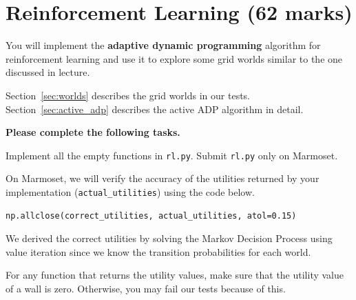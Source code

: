 \documentclass[12pt]{article}
\begin{document}
\newpage
\section{Reinforcement Learning (62 marks)}

You will implement the {\bf adaptive dynamic programming} algorithm for reinforcement learning and use it to explore some grid worlds similar to the one discussed in lecture.

Section~\ref{sec:worlds} describes the grid worlds in our tests. Section~\ref{sec:active_adp} describes the active ADP algorithm in detail.

{\bf Please complete the following tasks.}

Implement all the empty functions in \verb+rl.py+. Submit \verb+rl.py+ only on Marmoset.

On Marmoset, we will verify the accuracy of the utilities returned by your implementation (\verb+actual_utilities+) using the code below.
%
\begin{verbatim}
np.allclose(correct_utilities, actual_utilities, atol=0.15)
\end{verbatim}
%
We derived the correct utilities by solving the Markov Decision Process using value iteration since we know the transition probabilities for each world. 

For any function that returns the utility values, make sure that the utility value of a wall is zero. Otherwise, you may fail our tests because of this.
\end{document}
